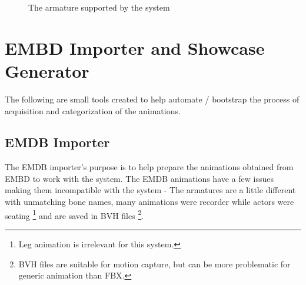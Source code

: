 \begin{figure}[!ht]
\centerline{}
\caption{The armature supported by the system}\label{fig:armature}
\end{figure}


\section{EMBD Importer and Showcase Generator}
The following are small tools created to help automate / bootstrap the process of acquisition and categorization of the animations.


\subsection{EMDB Importer}
The EMDB importer's purpose is to help prepare the animations obtained from EMBD to work with the system. The EMDB animations have a few issues making them incompatible with the system - The armatures are a little different with unmatching bone names, many animations were recorder while actors were seating \footnote{Leg animation is irrelevant for this system.} and are saved in BVH files \footnote{BVH files are suitable for motion capture, but can be more problematic for generic animation than FBX.}.

